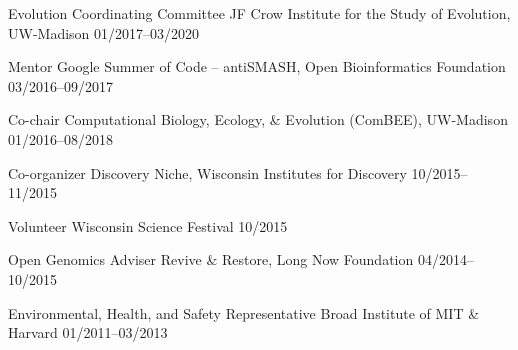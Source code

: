 \begin{cvhonors}
\cvhonor
{Evolution Coordinating Committee}
{JF Crow Institute for the Study of Evolution, UW-Madison}
{01/2017--03/2020}

\cvhonor
{Mentor}
{Google Summer of Code -- antiSMASH, Open Bioinformatics Foundation}
{03/2016--09/2017}

\cvhonor
{Co-chair}
{Computational Biology, Ecology, \& Evolution (ComBEE), UW-Madison}
{01/2016--08/2018}

\cvhonor
{Co-organizer}
{Discovery Niche, Wisconsin Institutes for Discovery}
{10/2015--11/2015}

\cvhonor
{Volunteer}
{Wisconsin Science Festival}
{10/2015}

\cvhonor
{Open Genomics Adviser}
{Revive \& Restore, Long Now Foundation}
{04/2014--10/2015}

\cvhonor
{Environmental, Health, and Safety Representative}
{Broad Institute of MIT \& Harvard}
{01/2011--03/2013}

\end{cvhonors}